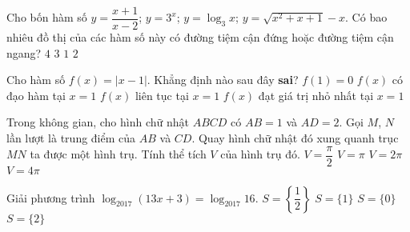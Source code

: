\begin{ex}%
Cho bốn hàm số $y=\dfrac{x+1}{x-2}$; $y=3^x$; $y=\log_3 x$; $y=\sqrt{x^2+x+1}-x$. Có bao nhiêu đồ thị của các hàm số này có đường tiệm cận đứng hoặc đường tiệm cận ngang?
\choice
{\True $4$}
{$3$}
{$1$}
{$2$}
\end{ex}
\begin{ex}%
Cho hàm số $f(x)=|x-1|$. Khẳng định nào sau đây \textbf{sai}?
\choice
{$f(1)=0$}
{\True $f(x)$ có đạo hàm tại $x=1$}
{$f(x)$ liên tục tại $x=1$}
{$f(x)$ đạt giá trị nhỏ nhất tại $x=1$}
\end{ex}
\begin{ex}%
Trong không gian, cho hình chữ nhật $ABCD$ có $AB=1$ và $AD=2$. Gọi $M$, $N$ lần lượt là trung điểm của $AB$ và $CD$. Quay hình chữ nhật đó xung quanh trục $MN$ ta được một hình trụ. Tính thể tích $V$ của hình trụ đó.
\choice
{\True $V=\dfrac{\pi}{2}$}
{$V=\pi$}
{$V=2\pi$}
{$V=4\pi$}
\end{ex}
\begin{ex}%
Giải phương trình $\log_{2017}(13x+3)=\log_{2017}16$.
\choice
{$S=\left\{\dfrac{1}{2}\right\}$}
{\True $S=\{1\}$}
{$S=\{0\}$}
{$S=\{2\}$}
\end{ex}
